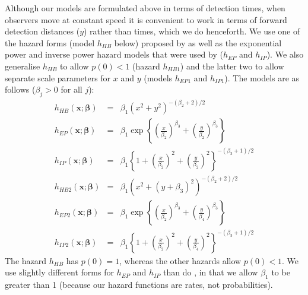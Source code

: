\documentclass[useAMS,usenatbib,referee]{biom}
\begin{document}
Although our models are formulated above in terms of detection times, when observers move at constant speed it is convenient to work in terms of forward detection distances ($y$) rather than times, which we do henceforth. We use one of the hazard forms (model $h_{HB}$ below) proposed by \cite{Hayes+Buckland:83} as well as the exponential power and inverse power hazard models that were used by \cite{Langrock+al:13} ($h_{EP}$ and $h_{IP}$). We also generalise $h_{HB}$ to allow $p(0)<1$ (hazard $h_{HB1}$) and the latter two  to allow separate scale parameters for $x$ and $y$ (models $h_{EP1}$ and $h_{IP1}$). The models are as follows ($\beta_j>0$ for all $j$):
\begin{eqnarray}
h_{HB}(\boldsymbol{x};\boldsymbol{\beta})&=&\beta_1 (x^2+y^2)^{-(\beta_2+2)/2} \nonumber \\
h_{EP}(\boldsymbol{x};\boldsymbol{\beta})&=&\beta_1\exp\left\{\left(\frac{x}{\beta_2}\right)^{\beta_3}+\left(\frac{y}{\beta_2}\right)^{\beta_3}\right\} \nonumber \\
h_{IP}(\boldsymbol{x};\boldsymbol{\beta})&=&\beta_1\left\{1+\left(\frac{x}{\beta_2}\right)^2+\left(\frac{y}{\beta_2}\right)^2\right\}^{-(\beta_3+1)/2} \nonumber \\
h_{HB2}(\boldsymbol{x};\boldsymbol{\beta})&=&\beta_1 (x^2+(y+\beta_3)^2)^{-(\beta_2+2)/2} \nonumber \\
h_{EP2}(\boldsymbol{x};\boldsymbol{\beta})&=&\beta_1\exp\left\{\left(\frac{x}{\beta_2}\right)^{\beta_3}+\left(\frac{y}{\beta_4}\right)^{\beta_3}\right\} \nonumber \\
h_{IP2}(\boldsymbol{x};\boldsymbol{\beta})&=&\beta_1\left\{1+\left(\frac{x}{\beta_2}\right)^2+\left(\frac{y}{\beta_4}\right)^2\right\}^{-(\beta_3+1)/2} \nonumber
\end{eqnarray}
The hazard $h_{HB}$ has $p(0)=1$, whereas the other hazards allow $p(0)<1$. We use slightly different forms for $h_{EP}$ and $h_{IP}$ than do \cite{Langrock+al:13}, in that we allow $\beta_1$ to be greater than 1 (because our hazard functions are rates, not probabilities). 
\end{document}
